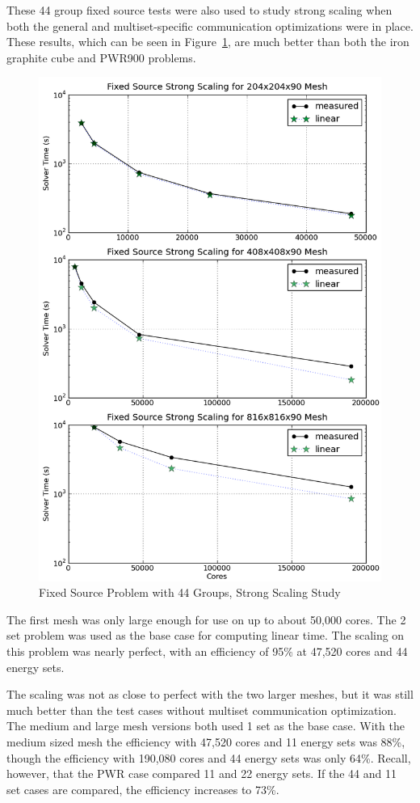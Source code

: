 These 44 group fixed source tests were also used to study strong scaling when both the general and multiset-specific communication optimizations were in place. These results, which can be seen in Figure~\ref{fig:FxdStrong}, are much better than both the iron graphite cube and PWR900 problems. 
%
\begin{figure}[!h]
  \begin{center}
    \includegraphics [width=.8\textwidth, height=0.95\textheight ] {FxdSrcKrylovStrongScaling}
  \end{center}
  \caption{Fixed Source Problem with 44 Groups, Strong Scaling Study}
  \label{fig:FxdStrong}
\end{figure}

The first mesh was only large enough for use on up to about 50,000 cores. The 2 set problem was used as the base case for computing linear time. The scaling on this problem was nearly perfect, with an efficiency of 95\% at 47,520 cores and 44 energy sets. 

The scaling was not as close to perfect with the two larger meshes, but it was still much better than the test cases without multiset communication optimization. The medium and large mesh versions both used 1 set as the base case. With the medium sized mesh the efficiency with 47,520 cores and 11 energy sets was 88\%, though the efficiency with 190,080 cores and 44 energy sets was only 64\%. Recall, however, that the PWR case compared 11 and 22 energy sets. If the 44 and 11 set cases are compared, the efficiency increases to 73\%.

